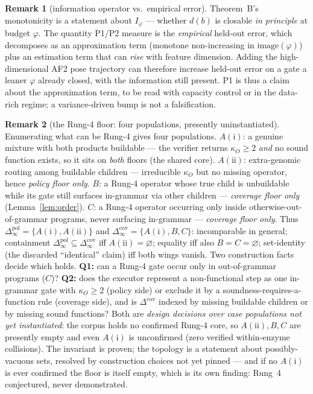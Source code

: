 \documentclass[11pt]{article}
\theoremstyle{plain}
\theoremstyle{definition}
\newtheorem{remark}{Remark}
\newcommand{\kO}{\kappa_{O}}
\begin{document}
\begin{remark}[information operator vs.\ empirical error]\label{rem:infovsemp}
Theorem~B's monotonicity is a statement about $I_\varphi$ --- whether $d(b)$ is closable \emph{in principle} at budget $\varphi$. The quantity P1/P2 measure is the \emph{empirical} held-out error, which decomposes as an approximation term (monotone non-increasing in $\mathrm{image}(\varphi)$) plus an estimation term that can \emph{rise} with feature dimension. Adding the high-dimensional AF2 pose trajectory can therefore increase held-out error on a gate a leaner $\varphi$ already closed, with the information still present. P1 is thus a claim about the approximation term, to be read with capacity control or in the data-rich regime; a variance-driven bump is not a falsification.
\end{remark}

\begin{remark}[the Rung-4 floor: four populations, presently uninstantiated]\label{rem:floor}
Enumerating what can be Rung-4 gives four populations. $A(\mathrm{i})$: a genuine mixture with both products buildable --- the verifier returns $\kO\ge 2$ \emph{and} no sound function exists, so it sits on \emph{both} floors (the shared core). $A(\mathrm{ii})$: extra-genomic routing among buildable children --- irreducible $\kO$ but no missing operator, hence \emph{policy floor only}. $B$: a Rung-4 operator whose true child is unbuildable while its gate still surfaces in-grammar via other children --- \emph{coverage floor only} (Lemma~\ref{lem:order}). $C$: a Rung-4 operator occurring only inside otherwise-out-of-grammar programs, never surfacing in-grammar --- \emph{coverage floor only}. Thus $\Delta^{\mathrm{pol}}_\infty=\{A(\mathrm{i}),A(\mathrm{ii})\}$ and $\Delta^{\mathrm{cov}}_\infty=\{A(\mathrm{i}),B,C\}$: incomparable in general; containment $\Delta^{\mathrm{pol}}_\infty\subseteq\Delta^{\mathrm{cov}}_\infty$ iff $A(\mathrm{ii})=\varnothing$; equality iff also $B=C=\varnothing$; set-identity (the discarded ``identical'' claim) iff both wings vanish. Two construction facts decide which holds. \textbf{Q1:} can a Rung-4 gate occur only in out-of-grammar programs ($C$)? \textbf{Q2:} does the executor represent a non-functional step as one in-grammar gate with $\kO\ge 2$ (policy side) or exclude it by a soundness-requires-a-function rule (coverage side), and is $\Delta^{\mathrm{cov}}$ indexed by missing buildable children or by missing sound functions? Both are \emph{design decisions over case populations not yet instantiated}: the corpus holds no confirmed Rung-4 core, so $A(\mathrm{ii}),B,C$ are presently empty and even $A(\mathrm{i})$ is unconfirmed (zero verified within-enzyme collisions). The invariant is proven; the topology is a statement about possibly-vacuous sets, resolved by construction choices not yet pinned --- and if no $A(\mathrm{i})$ is ever confirmed the floor is itself empty, which is its own finding: Rung~4 conjectured, never demonstrated.
\end{remark}
\end{document}

